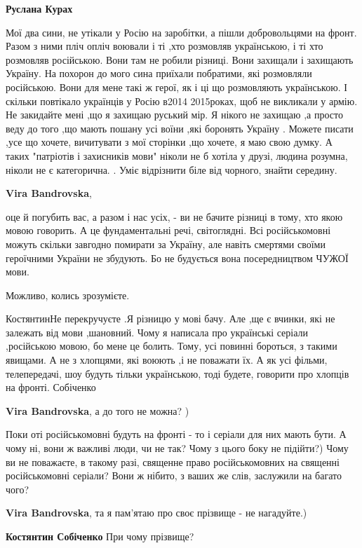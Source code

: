 \begin{itemize}
\begin{itemize}
\textbf{Руслана Курах} 

Мої два сини, не утікали у Росію на заробітки, а пішли добровольцями на фронт.
Разом з ними пліч опліч воювали і ті ,хто розмовляв українською, і ті хто
розмовляв російською. Вони там не робили різниці. Вони захищали і захищають
Україну. На похорон до мого сина приїхали побратими, які розмовляли російською.
Вони для мене такі ж герої, як і ці що розмовляють українською. І скільки
повтікало українців у Росію в2014 2015роках, щоб не викликали у армію. Не
закидайте мені ,що я захищаю руський мір. Я нікого не захищаю ,а просто веду до
того ,що мають пошану усі воїни ,які боронять Україну . Можете писати ,усе що
хочете, вичитувати з мої сторінки ,що хочете, я маю свою думку. А таких
"патріотів і захисників мови" ніколи не б хотіла у друзі, людина розумна,
ніколи не є категорична. . Уміє відрізнити біле від чорного, знайти середину.

\textbf{Vira Bandrovska}, 

оце й погубить вас, а разом і нас усіх, - ви не бачите різниці в тому, хто якою
мовою говорить. А це фундаментальні речі, світоглядні. Всі російськомовні
можуть скільки завгодно помирати за Україну, але навіть смертями своїми
героїчними України не збудують. Бо не будується вона посередництвом ЧУЖОЇ мови.

Можливо, колись зрозумієте.


КостянтинНе перекручуєте .Я різницю у мові бачу. Але ,ще є вчинки, які не
залежать від мови ,шановний. Чому я написала про українські серіали ,російською
мовою, бо мене це болить. Тому, усі повинні бороться, з такими явищами. А не з
хлопцями, які воюють ,і не поважати їх. А як усі фільми, телепередачі, шоу будуть
тільки українською, тоді будете, говорити про хлопців на фронті. Собіченко

\textbf{Vira Bandrovska}, а до того не можна? )

Поки оті російськомовні будуть на фронті - то і серіали для них мають бути. А
чому ні, вони ж важливі люди, чи не так? Чому з цього боку не підійти?) Чому ви
не поважаєте, в такому разі, священне право російськомовних на священні
російськомовні серіали? Вони ж нібито, з ваших же слів, заслужили на багато
чого?

\textbf{Vira Bandrovska}, та я пам'ятаю про своє прізвище - не нагадуйте.)

\textbf{Костянтин Собіченко} При чому прізвище?


\end{itemize}
\end{itemize}
